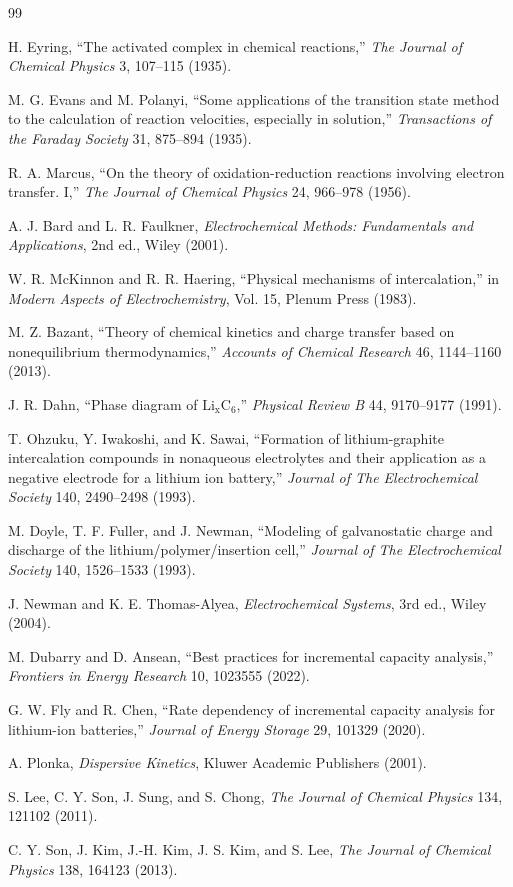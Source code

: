 \documentclass[11pt]{article}
\begin{document}
\begin{thebibliography}{99}

H. Eyring, ``The activated complex in chemical reactions,'' \emph{The Journal of Chemical Physics}
3, 107--115 (1935).

M. G. Evans and M. Polanyi, ``Some applications of the transition state method to the calculation of
reaction velocities, especially in solution,'' \emph{Transactions of the Faraday Society} 31, 875--894
(1935).

R. A. Marcus, ``On the theory of oxidation-reduction reactions involving electron transfer. I,''
\emph{The Journal of Chemical Physics} 24, 966--978 (1956).

A. J. Bard and L. R. Faulkner, \emph{Electrochemical Methods: Fundamentals and Applications},
2nd ed., Wiley (2001).

W. R. McKinnon and R. R. Haering, ``Physical mechanisms of intercalation,'' in
\emph{Modern Aspects of Electrochemistry}, Vol. 15, Plenum Press (1983).

M. Z. Bazant, ``Theory of chemical kinetics and charge transfer based on nonequilibrium
thermodynamics,'' \emph{Accounts of Chemical Research} 46, 1144--1160 (2013).

J. R. Dahn, ``Phase diagram of \(\mathrm{Li_xC_6}\),'' \emph{Physical Review B} 44, 9170--9177
(1991).

T. Ohzuku, Y. Iwakoshi, and K. Sawai, ``Formation of lithium-graphite intercalation compounds in
nonaqueous electrolytes and their application as a negative electrode for a lithium ion battery,''
\emph{Journal of The Electrochemical Society} 140, 2490--2498 (1993).

M. Doyle, T. F. Fuller, and J. Newman, ``Modeling of galvanostatic charge and discharge of the
lithium/polymer/insertion cell,'' \emph{Journal of The Electrochemical Society} 140, 1526--1533
(1993).

J. Newman and K. E. Thomas-Alyea, \emph{Electrochemical Systems}, 3rd ed., Wiley (2004).

M. Dubarry and D. Ansean, ``Best practices for incremental capacity analysis,'' \emph{Frontiers in
Energy Research} 10, 1023555 (2022).

G. W. Fly and R. Chen, ``Rate dependency of incremental capacity analysis for lithium-ion batteries,''
\emph{Journal of Energy Storage} 29, 101329 (2020).

A. Plonka, \emph{Dispersive Kinetics}, Kluwer Academic Publishers (2001).

S. Lee, C. Y. Son, J. Sung, and S. Chong, \emph{The Journal of Chemical Physics} 134, 121102
(2011).

C. Y. Son, J. Kim, J.-H. Kim, J. S. Kim, and S. Lee, \emph{The Journal of Chemical Physics} 138,
164123 (2013).

\end{thebibliography}
\end{document}
